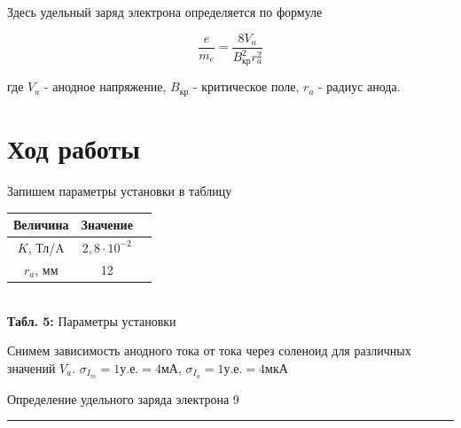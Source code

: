 \documentclass[12pt,a4paper]{scrartcl}
\begin{document}
Здесь удельный заряд электрона определяется по формуле

$$\dfrac{e}{m_e} = \dfrac{8V_a}{B_{\text{кр}}^2r_a^2}$$

где $V_a$ - анодное напряжение, $B_{\text{кр}}$ - критическое поле, $r_a$ - радиус анода.
	
\section{Ход работы}

Запишем параметры установки в таблицу
\begin{center}
\begin{tabular}{|c|c|c|}
\hline
Величина & Значение  \\ \hline
$K$, Тл/A & $2,8 \cdot 10^{-2}$  \\ \hline
$r_a$, мм & 12  \\ \hline
\end{tabular}\\
\textbf{Табл. 5:} Параметры установки
\end{center}	
	
Снимем зависимость анодного тока от тока через соленоид для различных значений $V_a$. $\sigma_{I_m}=1 \text{у.е.} = 4 \text{мА}$, $\sigma_{I_a}=1 \text{у.е.} = 4 \text{мкА}$

	\newpage
	
	\begin{flushleft}
		\footnotesize{Определение удельного заряда электрона} \hspace{\fill} \footnotesize{9}
		\\[-0.3cm]\noindent\rule{\textwidth}{0.3pt}
	\end{flushleft}
	
\end{document}
